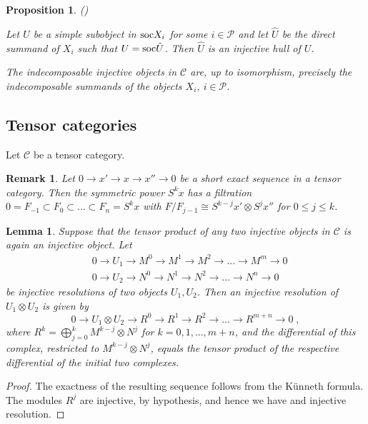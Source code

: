 \documentclass[12pt]{article}
\def\mc {\mathcal}
\newtheorem{lemma}[theorem]{Lemma}
\newtheorem{prop}[theorem]{Proposition}
\newtheorem{rem}{Remark}[section]
\begin{document}
\begin{prop}\label{Prop InjHullInGrothCat} (\cite[Proposition~2.5, Corollary~2.6]{Chirvasitu-Penkov-RC})

Let $U$ be a simple subobject in ${\rm soc}X_i$ for some $i\in\mc P$ and let $\hat U$ be the direct summand of $X_i$ such that $U={\rm soc}\hat U$. Then $\hat U$ is an injective hull of $U$.

The indecomposable injective objects in $\mc C$ are, up to isomorphism, precisely the indecomposable summands of the objects $X_i$, $i\in\mc P$.
\end{prop}


\subsection{Tensor categories}

Let $\mc C$ be a tensor category.

\begin{rem}
Let $0\to x'\to x\to x''\to 0$ be a short exact sequence in a tensor category. Then the symmetric power $S^kx$ has a filtration $0=F_{-1}\subset F_0\subset ...\subset F_n=S^kx$ with $F/F_{j-1}\cong S^{k-j}x'\otimes S^jx''$ for $0\leq j\leq k$.
\end{rem}

\begin{lemma}\label{Lemma TensInjRes}
Suppose that the tensor product of any two injective objects in $\mc C$ is again an injective object. Let
\begin{align*}
& 0 \to U_1 \to M^0 \to M^1 \to M^2 \to ...\to M^m \to 0 \\
& 0 \to U_2 \to N^0 \to N^1 \to N^2 \to ...\to N^n \to 0 
\end{align*}
be injective resolutions of two objects $U_1,U_2$. Then an injective resolution of $U_1\otimes U_2$ is given by
$$
0 \to U_1\otimes U_2 \to R^0 \to R^1 \to R^2 \to ...\to R^{m+n} \to 0  \;,
$$
where $R^k=\bigoplus\limits_{j=0}^k M^{k-j}\otimes N^j$ for $k=0,1,...,m+n$, and the differential of this complex, restricted to $M^{k-j}\otimes N^j$, equals the tensor product of the respective differential of the initial two complexes.
\end{lemma}


\begin{proof}
The exactness of the resulting sequence follows from the K\"unneth formula. The modules $R^j$ are injective, by hypothesis, and hence we have and injective resolution.
\end{proof}
\end{document}
